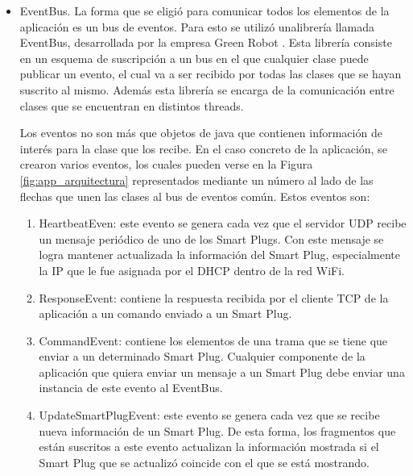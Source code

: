 \begin{itemize}
\item EventBus. La forma que se eligió para comunicar todos los elementos de la aplicación es un bus de eventos. Para esto se utilizó unalibrería llamada EventBus, desarrollada por la empresa Green Robot \citep{eventbus_web}. Esta librería consiste en un esquema de suscripción a un bus en el que cualquier clase puede publicar un evento, el cual va a ser recibido por todas las clases que se hayan suscrito al mismo. Además esta librería se encarga de la comunicación entre clases que se encuentran en distintos threads.

Los eventos no son más que objetos de java que contienen información de interés para la clase que los recibe. En el caso concreto de la aplicación, se crearon varios eventos, los cuales pueden verse en la Figura \ref{fig:app_arquitectura} representados mediante un número al lado de las flechas que unen las clases al bus de eventos común. Estos eventos son:


\begin{enumerate}
\item HeartbeatEven: este evento se genera cada vez que el servidor UDP recibe un mensaje periódico de uno de los Smart Plugs. Con este mensaje se logra mantener actualizada la información del Smart Plug, especialmente la IP que le fue asignada por el DHCP dentro de la red WiFi.
\item ResponseEvent: contiene la respuesta recibida por el cliente TCP de la aplicación a un comando enviado a un Smart Plug.
\item CommandEvent: contiene los elementos de una trama que se tiene que enviar a un determinado Smart Plug. Cualquier componente de la aplicación que quiera enviar un mensaje a un Smart Plug debe enviar una instancia de este evento al EventBus.
\item UpdateSmartPlugEvent: este evento se genera cada vez que se recibe nueva información de un Smart Plug. De esta forma, los fragmentos que están suscritos a este evento actualizan la información mostrada si el Smart Plug que se actualizó coincide con el que se está mostrando. 


\end{enumerate}
\end{itemize}
